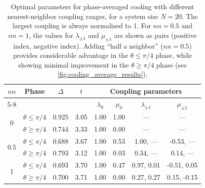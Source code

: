 \documentclass[aps,prx,twocolumn,superscriptaddress,nofootinbib,nolongbibliography,nobalancelastpage,10pt,floatfix]{revtex4-2}
\begin{document}
\begin{table}[!ht]
    \centering
    \begin{tabular}{cccccccc}
        \toprule
        \multirow{2}{*}{$nn$} & \multirow{2}{*}{Phase} & \multirow{2}{*}{$\Delta$} & \multirow{2}{*}{$t$} & \multicolumn{4}{c}{Coupling parameters}                 \\
        \cmidrule(lr){5-8}
                              &                        &                           &                      & $\lambda_0$ & $\mu_0$ & $\lambda_{\pm1}$ & $\mu_{\pm1}$ \\
        \midrule
        \multirow{2}{*}{0}    & $\theta \leq \pi/4$    & 0.925                     & 3.05                 & 1.00        & 1.00    & ---              & ---          \\
                              & $\theta \geq \pi/4$    & 0.744                     & 3.33                 & 1.00        & 0.00    & ---              & ---          \\
        \midrule
        \multirow{2}{*}{0.5}  & $\theta \leq \pi/4$    & 0.688                     & 3.67                 & 1.00        & 0.53    & 1.00, ---        & -0.53, ---   \\
                              & $\theta \geq \pi/4$    & 0.793                     & 3.12                 & 1.00        & 0.03    & 0.34, ---        & 0.14, ---    \\
        \midrule
        \multirow{2}{*}{1}    & $\theta \leq \pi/4$    & 0.693                     & 3.70                 & 1.00        & 0.47    & 0.97, 0.01       & -0.51, 0.05  \\
                              & $\theta \geq \pi/4$    & 0.700                     & 3.71                 & 1.00        & 0.00    & 0.27, 0.27       & 0.15, -0.15  \\
        \bottomrule
    \end{tabular}
    \caption{Optimal parameters for phase-averaged cooling with different nearest-neighbor coupling ranges, for a system size $N=20$. The largest coupling is always normalized to 1. For $nn=0.5$ and $nn=1$, the values for $\lambda_{\pm1}$ and $\mu_{\pm1}$ are shown as pairs (positive index, negative index). Adding ``half a neighbor'' ($nn=0.5$) provides considerable advantage in the $\theta \leq \pi/4$ phase, while showing minimal improvement in the $\theta \geq \pi/4$ phase (see \cref{fig:cooling_average_results}).}
    \label{tab:optimal_cool_avg}
\end{table}
\end{document}
